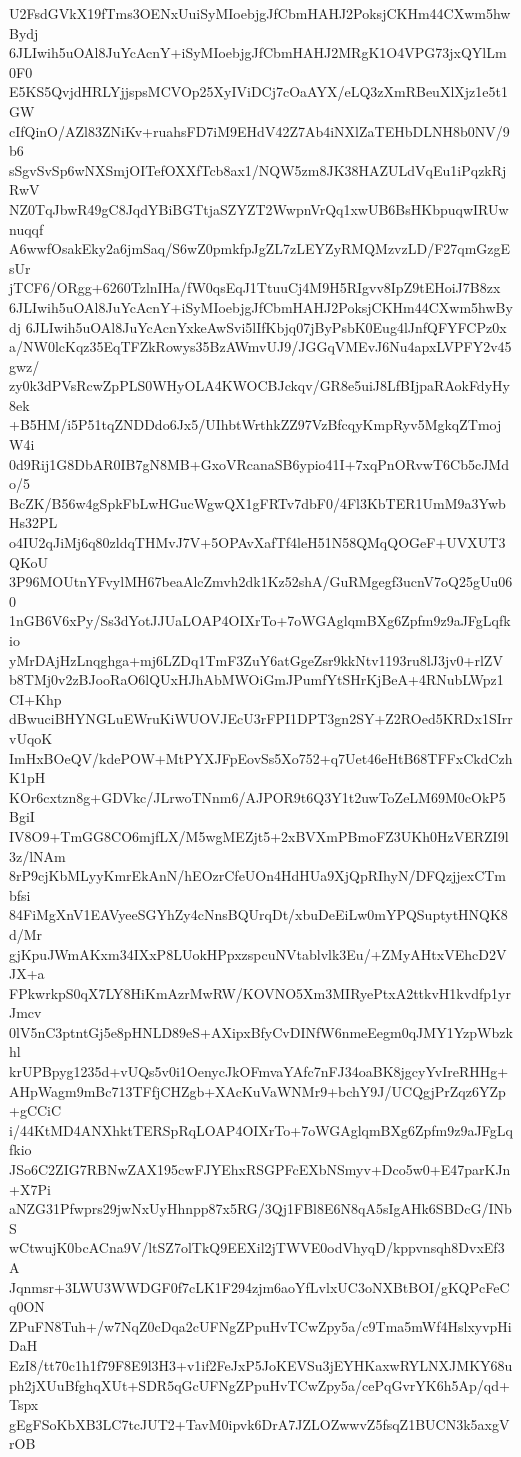 U2FsdGVkX19fTms3OENxUuiSyMIoebjgJfCbmHAHJ2PoksjCKHm44CXwm5hwBydj
6JLIwih5uOAl8JuYcAcnY+iSyMIoebjgJfCbmHAHJ2MRgK1O4VPG73jxQYlLm0F0
E5KS5QvjdHRLYjjspsMCVOp25XyIViDCj7cOaAYX/eLQ3zXmRBeuXlXjz1e5t1GW
cIfQinO/AZl83ZNiKv+ruahsFD7iM9EHdV42Z7Ab4iNXlZaTEHbDLNH8b0NV/9b6
sSgvSvSp6wNXSmjOITefOXXfTcb8ax1/NQW5zm8JK38HAZULdVqEu1iPqzkRjRwV
NZ0TqJbwR49gC8JqdYBiBGTtjaSZYZT2WwpnVrQq1xwUB6BsHKbpuqwIRUwnuqqf
A6wwfOsakEky2a6jmSaq/S6wZ0pmkfpJgZL7zLEYZyRMQMzvzLD/F27qmGzgEsUr
jTCF6/ORgg+6260TzlnIHa/fW0qsEqJ1TtuuCj4M9H5RIgvv8IpZ9tEHoiJ7B8zx
6JLIwih5uOAl8JuYcAcnY+iSyMIoebjgJfCbmHAHJ2PoksjCKHm44CXwm5hwBydj
6JLIwih5uOAl8JuYcAcnYxkeAwSvi5lIfKbjq07jByPsbK0Eug4lJnfQFYFCPz0x
a/NW0lcKqz35EqTFZkRowys35BzAWmvUJ9/JGGqVMEvJ6Nu4apxLVPFY2v45gwz/
zy0k3dPVsRcwZpPLS0WHyOLA4KWOCBJckqv/GR8e5uiJ8LfBIjpaRAokFdyHy8ek
+B5HM/i5P51tqZNDDdo6Jx5/UIhbtWrthkZZ97VzBfcqyKmpRyv5MgkqZTmojW4i
0d9Rij1G8DbAR0IB7gN8MB+GxoVRcanaSB6ypio41I+7xqPnORvwT6Cb5cJMdo/5
BcZK/B56w4gSpkFbLwHGucWgwQX1gFRTv7dbF0/4Fl3KbTER1UmM9a3YwbHs32PL
o4IU2qJiMj6q80zldqTHMvJ7V+5OPAvXafTf4leH51N58QMqQOGeF+UVXUT3QKoU
3P96MOUtnYFvylMH67beaAlcZmvh2dk1Kz52shA/GuRMgegf3ucnV7oQ25gUu060
1nGB6V6xPy/Ss3dYotJJUaLOAP4OIXrTo+7oWGAglqmBXg6Zpfm9z9aJFgLqfkio
yMrDAjHzLnqghga+mj6LZDq1TmF3ZuY6atGgeZsr9kkNtv1193ru8lJ3jv0+rlZV
b8TMj0v2zBJooRaO6lQUxHJhAbMWOiGmJPumfYtSHrKjBeA+4RNubLWpz1CI+Khp
dBwuciBHYNGLuEWruKiWUOVJEcU3rFPI1DPT3gn2SY+Z2ROed5KRDx1SIrrvUqoK
ImHxBOeQV/kdePOW+MtPYXJFpEovSs5Xo752+q7Uet46eHtB68TFFxCkdCzhK1pH
KOr6cxtzn8g+GDVkc/JLrwoTNnm6/AJPOR9t6Q3Y1t2uwToZeLM69M0cOkP5BgiI
IV8O9+TmGG8CO6mjfLX/M5wgMEZjt5+2xBVXmPBmoFZ3UKh0HzVERZI9l3z/lNAm
8rP9cjKbMLyyKmrEkAnN/hEOzrCfeUOn4HdHUa9XjQpRIhyN/DFQzjjexCTmbfsi
84FiMgXnV1EAVyeeSGYhZy4cNnsBQUrqDt/xbuDeEiLw0mYPQSuptytHNQK8d/Mr
gjKpuJWmAKxm34IXxP8LUokHPpxzspcuNVtablvlk3Eu/+ZMyAHtxVEhcD2VJX+a
FPkwrkpS0qX7LY8HiKmAzrMwRW/KOVNO5Xm3MIRyePtxA2ttkvH1kvdfp1yrJmcv
0lV5nC3ptntGj5e8pHNLD89eS+AXipxBfyCvDINfW6nmeEegm0qJMY1YzpWbzkhl
krUPBpyg1235d+vUQs5v0i1OenycJkOFmvaYAfc7nFJ34oaBK8jgcyYvIreRHHg+
AHpWagm9mBc713TFfjCHZgb+XAcKuVaWNMr9+bchY9J/UCQgjPrZqz6YZp+gCCiC
i/44KtMD4ANXhktTERSpRqLOAP4OIXrTo+7oWGAglqmBXg6Zpfm9z9aJFgLqfkio
JSo6C2ZIG7RBNwZAX195cwFJYEhxRSGPFcEXbNSmyv+Dco5w0+E47parKJn+X7Pi
aNZG31Pfwprs29jwNxUyHhnpp87x5RG/3Qj1FBl8E6N8qA5sIgAHk6SBDcG/INbS
wCtwujK0bcACna9V/ltSZ7olTkQ9EEXil2jTWVE0odVhyqD/kppvnsqh8DvxEf3A
Jqnmsr+3LWU3WWDGF0f7cLK1F294zjm6aoYfLvlxUC3oNXBtBOI/gKQPcFeCq0ON
ZPuFN8Tuh+/w7NqZ0cDqa2cUFNgZPpuHvTCwZpy5a/c9Tma5mWf4HslxyvpHiDaH
EzI8/tt70c1h1f79F8E9l3H3+v1if2FeJxP5JoKEVSu3jEYHKaxwRYLNXJMKY68u
ph2jXUuBfghqXUt+SDR5qGcUFNgZPpuHvTCwZpy5a/cePqGvrYK6h5Ap/qd+Tspx
gEgFSoKbXB3LC7tcJUT2+TavM0ipvk6DrA7JZLOZwwvZ5fsqZ1BUCN3k5axgVrOB
